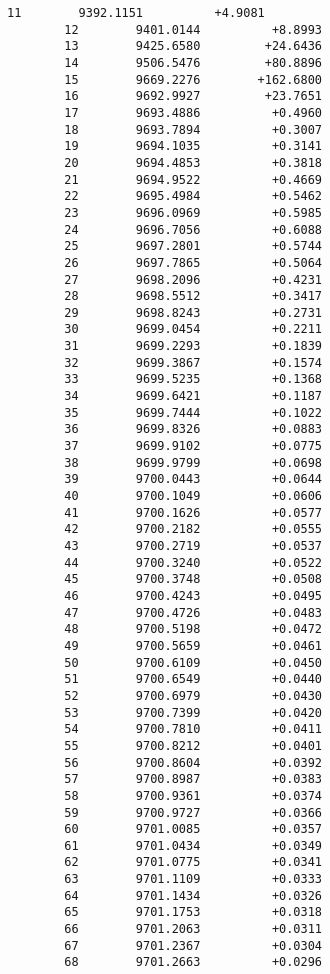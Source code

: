 \documentclass[11pt]{article}
\begin{document}
\begin{Verbatim}[commandchars=\\\{\}]
        11        9392.1151          +4.9081
        12        9401.0144          +8.8993
        13        9425.6580         +24.6436
        14        9506.5476         +80.8896
        15        9669.2276        +162.6800
        16        9692.9927         +23.7651
        17        9693.4886          +0.4960
        18        9693.7894          +0.3007
        19        9694.1035          +0.3141
        20        9694.4853          +0.3818
        21        9694.9522          +0.4669
        22        9695.4984          +0.5462
        23        9696.0969          +0.5985
        24        9696.7056          +0.6088
        25        9697.2801          +0.5744
        26        9697.7865          +0.5064
        27        9698.2096          +0.4231
        28        9698.5512          +0.3417
        29        9698.8243          +0.2731
        30        9699.0454          +0.2211
        31        9699.2293          +0.1839
        32        9699.3867          +0.1574
        33        9699.5235          +0.1368
        34        9699.6421          +0.1187
        35        9699.7444          +0.1022
        36        9699.8326          +0.0883
        37        9699.9102          +0.0775
        38        9699.9799          +0.0698
        39        9700.0443          +0.0644
        40        9700.1049          +0.0606
        41        9700.1626          +0.0577
        42        9700.2182          +0.0555
        43        9700.2719          +0.0537
        44        9700.3240          +0.0522
        45        9700.3748          +0.0508
        46        9700.4243          +0.0495
        47        9700.4726          +0.0483
        48        9700.5198          +0.0472
        49        9700.5659          +0.0461
        50        9700.6109          +0.0450
        51        9700.6549          +0.0440
        52        9700.6979          +0.0430
        53        9700.7399          +0.0420
        54        9700.7810          +0.0411
        55        9700.8212          +0.0401
        56        9700.8604          +0.0392
        57        9700.8987          +0.0383
        58        9700.9361          +0.0374
        59        9700.9727          +0.0366
        60        9701.0085          +0.0357
        61        9701.0434          +0.0349
        62        9701.0775          +0.0341
        63        9701.1109          +0.0333
        64        9701.1434          +0.0326
        65        9701.1753          +0.0318
        66        9701.2063          +0.0311
        67        9701.2367          +0.0304
        68        9701.2663          +0.0296

\end{Verbatim}
\end{document}
